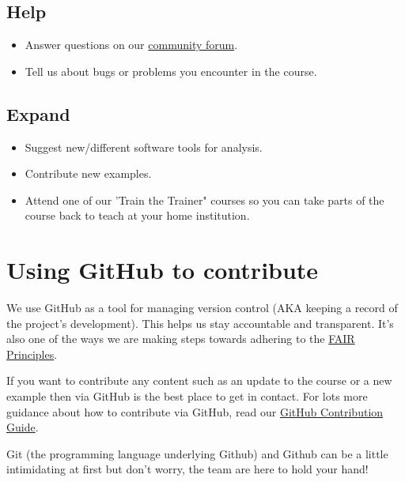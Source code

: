 \documentclass[
]{book}
\providecommand{\tightlist}{%
  \setlength{\itemsep}{0pt}\setlength{\parskip}{0pt}}
\begin{document}
\hypertarget{help}{%
\subsection*{Help}\label{help}}

\begin{itemize}
\tightlist
\item
  Answer questions on our \href{https://cloudspan.peerboard.com/}{community forum}.
\item
  Tell us about bugs or problems you encounter in the course.
\end{itemize}

\hypertarget{expand}{%
\subsection*{Expand}\label{expand}}

\begin{itemize}
\tightlist
\item
  Suggest new/different software tools for analysis.
\item
  Contribute new examples.
\item
  Attend one of our 'Train the Trainer" courses so you can take parts of the course back to teach at your home institution.
\end{itemize}

\hypertarget{using-github-to-contribute}{%
\section{Using GitHub to contribute}\label{using-github-to-contribute}}

We use GitHub as a tool for managing version control (AKA keeping a record of the project's development). This helps us stay accountable and transparent. It's also one of the ways we are making steps towards adhering to the \protect\hyperlink{fair-principles}{FAIR Principles}.

If you want to contribute any content such as an update to the course or a new example then via GitHub is the best place to get in contact. For lots more guidance about how to contribute via GitHub, read our \href{https://github.com/Cloud-SPAN/CloudSPAN-handbook/blob/main/CONTRIBUTING.md}{GitHub Contribution Guide}.

Git (the programming language underlying Github) and Github can be a little intimidating at first but don't worry, the team are here to hold your hand! 🤝
\end{document}

